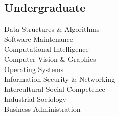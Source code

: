 \documentclass[]{resume}
\begin{document}
\begin{minipage}[t]{0.33\textwidth}
\subsection{Undergraduate}
Data Structures \& Algorithms \\
Software Maintenance \\
Computational Intelligence\\
Computer Vision \& Graphics \\
Operating Systems \\
Information Security \& Networking \\
Intercultural Social Competence \\
Industrial Sociology \\
Business Administration 
\sectionsep

\end{minipage}\quad %
\end{document}
